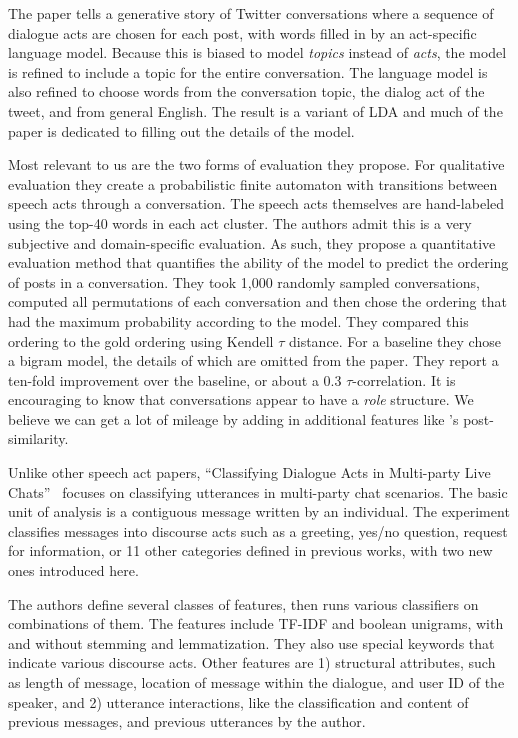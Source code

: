\documentclass[11pt]{article}
\newcommand{\titlecite}[2]{``#1''~\cite{#2}}
\begin{document}
The paper tells a generative story of Twitter conversations where a sequence of dialogue
acts are chosen for each post, with words filled in by an act-specific language model.
Because this is biased to model \textit{topics}
instead of \textit{acts}, the model is refined to include a topic 
for the entire conversation. The language model is also refined to choose words from
the conversation topic, the dialog act of the tweet, and from general English. The result
is a variant of LDA and much of the paper is dedicated to filling out the details of the model.

Most relevant to us are the two forms of evaluation they propose. For
qualitative evaluation they create a probabilistic finite automaton with
transitions between speech acts through a conversation. The speech acts
themselves are hand-labeled using the top-40 words in each act cluster. The 
authors admit this is a very subjective and domain-specific evaluation. As such,
they propose a quantitative evaluation method that quantifies the ability of
the model to predict the ordering of posts in a conversation. They took
1,000 randomly sampled conversations, computed all permutations
of each conversation and then chose the ordering that had the maximum
probability according to the model. They compared this ordering to the gold
ordering using Kendell $\tau$ distance. For a baseline they chose a bigram
model, the details of which are omitted from the paper. They report a ten-fold improvement
over the baseline, or about a 0.3 $\tau$-correlation. It is encouraging to know
that conversations appear to have a \textit{role} structure. We believe we can get a lot of mileage
by adding in additional features like \cite{Wang2008a}'s post-similarity.

Unlike other speech act papers, \titlecite{Classifying Dialogue Acts in Multi-party Live Chats}{Kim2012} 
focuses on classifying utterances
in multi-party chat scenarios. The basic unit
of analysis is a contiguous message written by an individual. The
experiment classifies messages into discourse acts such as a greeting, yes/no
question, request for information, or 11 other categories defined in previous
works, with two new ones introduced here.

The authors define several classes of features, then runs various classifiers on
combinations of them. The features include TF-IDF and boolean unigrams, with
and without stemming and lemmatization. They also use special keywords 
that indicate various discourse acts. Other
features are 1) structural attributes, such as length of message, location of
message within the dialogue, and user ID of the speaker, and 2) utterance
interactions, like the classification and content of previous messages, and
previous utterances by the author.
\end{document}
